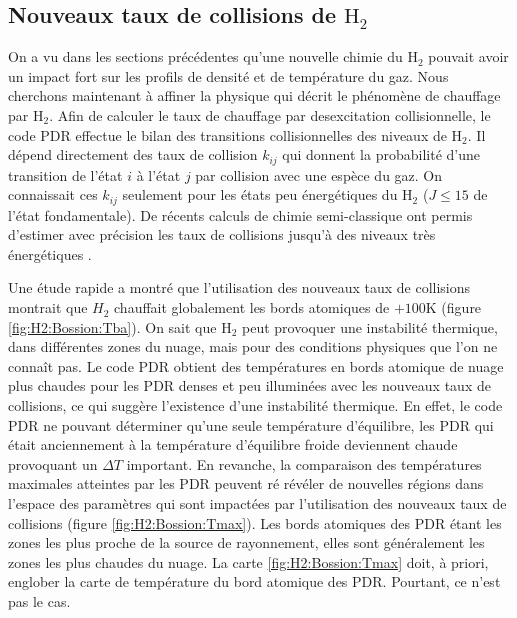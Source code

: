 \subsection{Nouveaux taux de collisions de $\mathrm{H}_2$}

On a vu dans les sections précédentes qu'une nouvelle chimie du $\mathrm{H}_2$ pouvait avoir un impact fort sur les profils de densité et de température du gaz. Nous cherchons maintenant à affiner la physique qui décrit le phénomène de chauffage par $\mathrm{H}_2$. Afin de calculer le taux de chauffage par desexcitation collisionnelle, le code PDR effectue le bilan des transitions collisionnelles des niveaux de $\mathrm{H}_2$. Il dépend directement des taux de collision $k_{ij}$ qui donnent la probabilité d'une transition de l'état $i$ à l'état $j$ par collision avec une espèce du gaz. On connaissait ces $k_{ij}$ seulement pour les états peu énergétiques du $\mathrm{H}_2$ ($J\leq15$ de l'état fondamentale). De récents calculs de chimie semi-classique ont permis d'estimer avec précision les taux de collisions jusqu'à des niveaux très énergétiques \cite{Bossion}. \newline 


Une étude rapide a montré que l'utilisation des nouveaux taux de collisions montrait que $H_2$ chauffait globalement les bords atomiques de $+100$K (figure \ref{fig:H2:Bossion:Tba}). On sait que $\mathrm{H}_2$ peut provoquer une instabilité thermique, dans différentes zones du nuage, mais pour des conditions physiques que l'on ne connaît pas. Le code PDR obtient des températures en bords atomique de nuage plus chaudes pour les PDR denses et peu illuminées avec les nouveaux taux de collisions, ce qui suggère l'existence d'une instabilité thermique. En effet, le code PDR ne pouvant déterminer qu'une seule température d'équilibre, les PDR qui était anciennement à la température d'équilibre froide deviennent chaude provoquant un $\Delta T$ important. \newline 
En revanche, la comparaison des températures maximales atteintes par les PDR peuvent ré révéler de nouvelles régions dans l'espace des paramètres qui sont impactées par l'utilisation des nouveaux taux de collisions (figure \ref{fig:H2:Bossion:Tmax}). Les bords atomiques des PDR étant les zones les plus proche de la source de rayonnement, elles sont généralement les zones les plus chaudes du nuage. La carte \ref{fig:H2:Bossion:Tmax} doit, à priori, englober la carte de température du bord atomique des PDR. Pourtant, ce n'est pas le cas.

